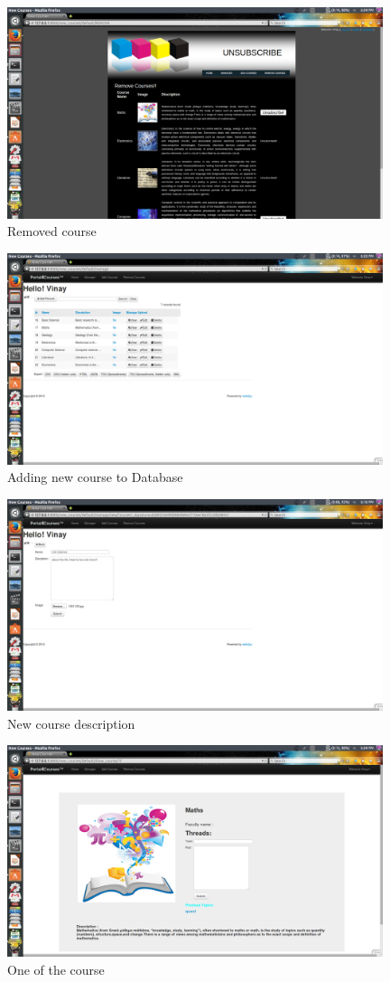 \documentclass{article}
\begin{document}
\begin{figure}[ht!]
\centering
\includegraphics[width=110mm]{removed.png}
\caption{Removed course}
\end{figure}
\begin{figure}[ht!]
\centering
\includegraphics[width=110mm]{admin.png}
\caption{Adding new course to Database}
\end{figure}
\begin{figure}[ht!]
\centering
\includegraphics[width=110mm]{Add_new.png}
\caption{New course description}
\end{figure}
\begin{figure}[ht!]
\centering
\includegraphics[width=110mm]{course.png}
\caption{One of the course}
\end{figure}
\end{document}
